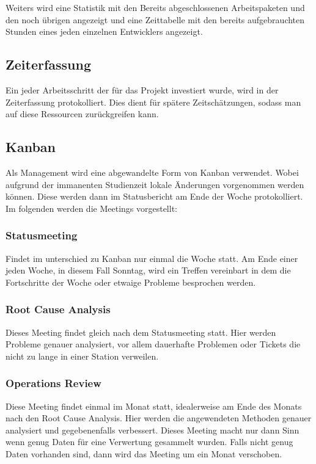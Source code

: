 \documentclass[a4paper]{book}
\begin{document}
\noindent Weiters wird eine Statistik mit den Bereits abgeschlossenen Arbeitspaketen und den noch übrigen angezeigt und eine Zeittabelle mit den bereits aufgebrauchten Stunden eines jeden einzelnen Entwicklers angezeigt.

\subsection{Zeiterfassung}
Ein jeder Arbeitsschritt der für das Projekt investiert wurde, wird in der Zeiterfassung protokolliert. Dies dient für spätere Zeitschätzungen, sodass man auf diese Ressourcen zurückgreifen kann.

\subsection{Kanban}
Als Management wird eine abgewandelte Form von Kanban verwendet. Wobei aufgrund der immanenten Studienzeit lokale Änderungen vorgenommen werden können. Diese werden dann im Statusbericht am Ende der Woche protokolliert. Im folgenden werden die Meetings vorgestellt:

\subsubsection{Statusmeeting}
Findet im unterschied zu Kanban nur einmal die Woche statt. Am Ende einer jeden Woche, in diesem Fall Sonntag, wird ein Treffen vereinbart in dem die Fortschritte der Woche oder etwaige Probleme besprochen werden.

\subsubsection{Root Cause Analysis}
Dieses Meeting findet gleich nach dem Statusmeeting statt. Hier werden Probleme genauer analysiert, vor allem dauerhafte Problemen oder Tickets die nicht zu lange in einer Station verweilen.

\subsubsection{Operations Review}
Diese Meeting findet einmal im Monat statt, idealerweise am Ende des Monats nach den Root Cause Analysis. Hier werden die angewendeten Methoden genauer analysiert und gegebenenfalls verbessert. Dieses Meeting macht nur dann Sinn wenn genug Daten für eine Verwertung gesammelt wurden. Falls nicht genug Daten vorhanden sind, dann wird das Meeting um ein Monat verschoben.
\end{document}
